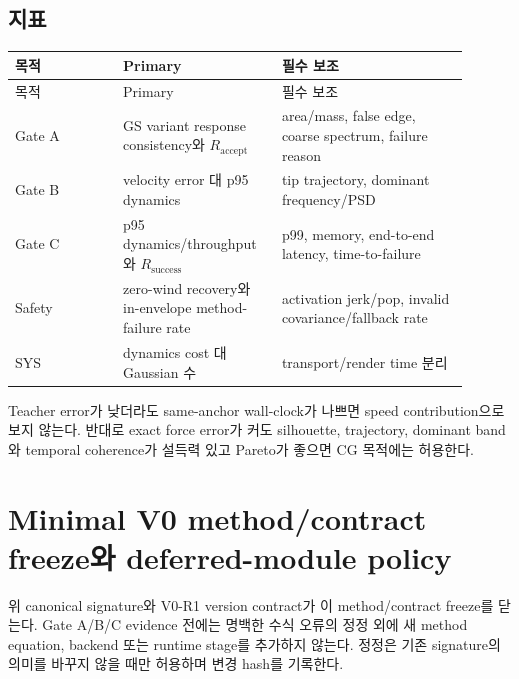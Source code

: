 \documentclass[11pt]{article}
\begin{document}
\subsection{지표}

\begin{longtable}{L{0.22\linewidth}L{0.30\linewidth}L{0.38\linewidth}}
\toprule
목적 & Primary & 필수 보조\\
\midrule
\endfirsthead
\toprule
목적 & Primary & 필수 보조\\
\midrule
\endhead
Gate A & GS variant response consistency와 \(R_{\mathrm{accept}}\) &
area/mass, false edge, coarse spectrum, failure reason\\
Gate B & velocity error 대 p95 dynamics & tip trajectory, dominant frequency/PSD\\
Gate C & p95 dynamics/throughput와 \(R_{\mathrm{success}}\) &
p99, memory, end-to-end latency, time-to-failure\\
Safety & zero-wind recovery와 in-envelope method-failure rate &
activation jerk/pop, invalid covariance/fallback rate\\
SYS & dynamics cost 대 Gaussian 수 & transport/render time 분리\\
\bottomrule
\end{longtable}

Teacher error가 낮더라도 same-anchor wall-clock가 나쁘면 speed contribution으로 보지 않는다.
반대로 exact force error가 커도 silhouette, trajectory, dominant band와 temporal coherence가
설득력 있고 Pareto가 좋으면 CG 목적에는 허용한다.

\section{Minimal V0 method/contract freeze와 deferred-module policy}

위 canonical signature와 V0-R1 version contract가 이 method/contract freeze를 닫는다.
Gate A/B/C evidence 전에는 명백한 수식 오류의 정정 외에 새 method equation, backend 또는 runtime stage를
추가하지 않는다. 정정은 기존 signature의 의미를 바꾸지 않을 때만 허용하며 변경 hash를 기록한다.
\end{document}
